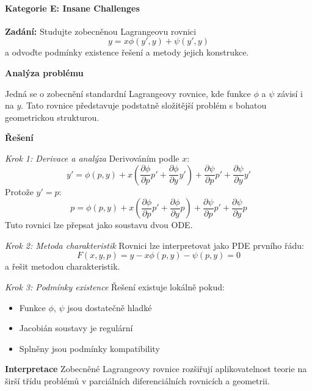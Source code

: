 \paragraph*{Kategorie E: Insane Challenges}

\begin{example}
\label{ex:zobecnene-lagrange}

\noindent\textbf{Zadání:} Studujte zobecněnou Lagrangeovu rovnici
\[
y = x\phi(y', y) + \psi(y', y)
\]
a odvoďte podmínky existence řešení a metody jejich konstrukce.

\vspace{1.5\baselineskip}

\noindent\textbf{Analýza problému}

Jedná se o zobecnění standardní Lagrangeovy rovnice, kde funkce $\phi$ a $\psi$ závisí i na $y$. Tato rovnice představuje podstatně složitější problém s bohatou geometrickou strukturou.

\vspace{1.5\baselineskip}

\noindent\textbf{Řešení}

\noindent\textit{Krok 1: Derivace a analýza}
Derivováním podle $x$:
\[
y' = \phi(p, y) + x\left(\frac{\partial\phi}{\partial p}p' + \frac{\partial\phi}{\partial y}y'\right) + \frac{\partial\psi}{\partial p}p' + \frac{\partial\psi}{\partial y}y'
\]
Protože $y' = p$:
\[
p = \phi(p, y) + x\left(\frac{\partial\phi}{\partial p}p' + \frac{\partial\phi}{\partial y}p\right) + \frac{\partial\psi}{\partial p}p' + \frac{\partial\psi}{\partial y}p
\]
Tuto rovnici lze přepsat jako soustavu dvou ODE.

\vspace{1\baselineskip}

\noindent\textit{Krok 2: Metoda charakteristik}
Rovnici lze interpretovat jako PDE prvního řádu:
\[
F(x, y, p) = y - x\phi(p, y) - \psi(p, y) = 0
\]
a řešit metodou charakteristik.

\vspace{1\baselineskip}

\noindent\textit{Krok 3: Podmínky existence}
Řešení existuje lokálně pokud:
\begin{itemize}
\item Funkce $\phi$, $\psi$ jsou dostatečně hladké
\item Jacobián soustavy je regulární
\item Splněny jsou podmínky kompatibility
\end{itemize}

\vspace{1.5\baselineskip}

\noindent\textbf{Interpretace}
Zobecněné Lagrangeovy rovnice rozšiřují aplikovatelnost teorie na širší třídu problémů v parciálních diferenciálních rovnicích a geometrii.

\end{example}

